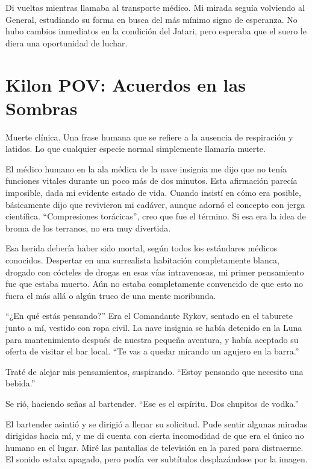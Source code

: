 \documentclass[spanish,12pt,a4paper,oneside,titlepage]{book}
\begin{document}
    Di vueltas mientras llamaba al transporte médico. Mi mirada seguía volviendo al General, estudiando su forma en busca del más mínimo signo de esperanza. No hubo cambios inmediatos en la condición del Jatari, pero esperaba que el suero le diera una oportunidad de luchar.

    \chapter{Kilon POV: Acuerdos en las Sombras}

    Muerte clínica. Una frase humana que se refiere a la ausencia de respiración y latidos. Lo que cualquier especie normal simplemente llamaría muerte.

    El médico humano en la ala médica de la nave insignia me dijo que no tenía funciones vitales durante un poco más de dos minutos. Esta afirmación parecía imposible, dada mi evidente estado de vida. Cuando insistí en cómo era posible, básicamente dijo que revivieron mi cadáver, aunque adornó el concepto con jerga científica. ``Compresiones torácicas'', creo que fue el término. Si esa era la idea de broma de los terranos, no era muy divertida.

    Esa herida debería haber sido mortal, según todos los estándares médicos conocidos. Despertar en una surrealista habitación completamente blanca, drogado con cócteles de drogas en esas vías intravenosas, mi primer pensamiento fue que estaba muerto. Aún no estaba completamente convencido de que esto no fuera el más allá o algún truco de una mente moribunda.

    ``¿En qué estás pensando?'' Era el Comandante Rykov, sentado en el taburete junto a mí, vestido con ropa civil. La nave insignia se había detenido en la Luna para mantenimiento después de nuestra pequeña aventura, y había aceptado su oferta de visitar el bar local. ``Te vas a quedar mirando un agujero en la barra.''

    Traté de alejar mis pensamientos, suspirando. ``Estoy pensando que necesito una bebida.''

    Se rió, haciendo señas al bartender. ``Ese es el espíritu. Dos chupitos de vodka.''

    El bartender asintió y se dirigió a llenar su solicitud. Pude sentir algunas miradas dirigidas hacia mí, y me di cuenta con cierta incomodidad de que era el único no humano en el lugar. Miré las pantallas de televisión en la pared para distraerme. El sonido estaba apagado, pero podía ver subtítulos desplazándose por la imagen.
\end{document}
